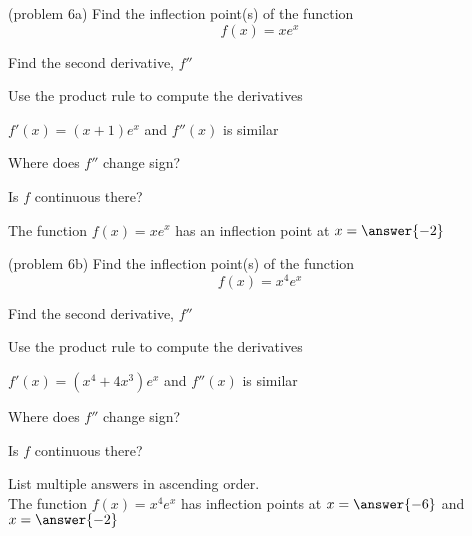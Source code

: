 \documentclass[handout]{ximera}
\begin{document}
\begin{problem}(problem 6a)
  Find the inflection point(s) of the function
  \[
     f(x) = xe^x
  \]
  
    \begin{hint}
      Find the second derivative, $f''$
    \end{hint}
    \begin{hint}
      Use the product rule to compute the derivatives
    \end{hint}
		\begin{hint}
      $f'(x) = (x+1)e^x$ and $f''(x)$ is similar
    \end{hint}
		\begin{hint}
      Where does $f''$ change sign?
    \end{hint}
    \begin{hint}
      Is $f$ continuous there?
    \end{hint}  
		The function $f(x) = xe^x$ has an inflection 
		point at $x =\answer{-2}$
		
\end{problem}

\begin{problem}(problem 6b)
  Find the inflection point(s) of the function
  \[
     f(x) = x^4e^x
  \]
  
    \begin{hint}
      Find the second derivative, $f''$
    \end{hint}
    \begin{hint}
      Use the product rule to compute the derivatives
    \end{hint}
		\begin{hint}
      $f'(x) = (x^4+4x^3)e^x$ and $f''(x)$ is similar
    \end{hint}
		\begin{hint}
      Where does $f''$ change sign?
    \end{hint}
    \begin{hint}
      Is $f$ continuous there?
    \end{hint} 
		List multiple answers in ascending order.\\
		The function $f(x) = x^4e^x$ has inflection points at 
		$x =\answer{-6}$ and $x =\answer{-2}$
		
\end{problem}
\end{document}
